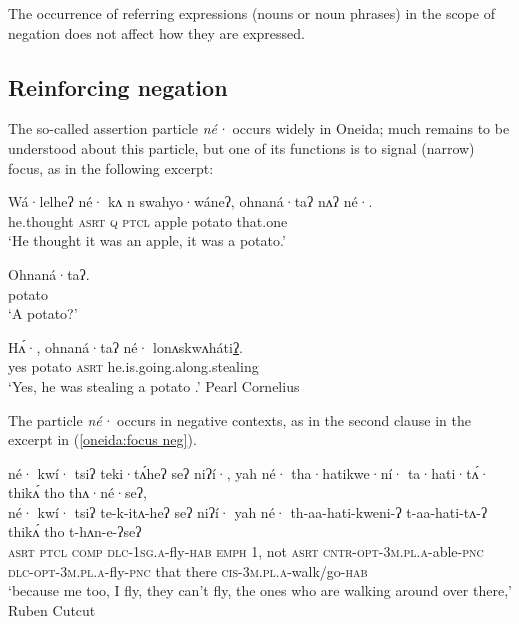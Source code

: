 \documentclass[output=paper,colorlinks,citecolor=brown]{langscibook}
\begin{document}
The occurrence of referring expressions (nouns or noun phrases) in the scope of negation does not affect how they are expressed.

\subsection{Reinforcing negation}
\label{oneida:sec:emph}

The so-called assertion particle \textit{né·} occurs widely in Oneida; much remains to be understood about this particle, but one of its functions is to signal (narrow) focus, as in the following excerpt:

\ea\label{oneida:focus potato}
    \begin{xlist}[B: ]
        \item[A: ] \gll Wá·lelheʔ né· kʌ n swahyo·wáneʔ, ohnaná·taʔ  {nʌʔ né·}. \\
        {he.thought} \textsc{asrt} \textsc{q} \textsc{ptcl} apple potato {that.one} \\
        \glt `He thought it was an apple, it was a potato.' \\
        \item[B: ] Ohnaná·taʔ. \\
        {} potato\\
        \glt `A potato?' \\
        \item[A: ] \gll Hʌ́·, ohnaná·taʔ né· lonʌskwʌháti\uline{ʔ}. \\
         yes potato \textsc{asrt} {he.is.going.along.stealing} \\
        \glt `Yes, he was stealing a potato .' Pearl Cornelius \citep[303 (50--52)]{MichelsonEtAl2016}
    \end{xlist}
\z

The particle \textit{né·} occurs in negative contexts, as in the second clause in the excerpt in (\ref{oneida:focus neg}).

\ea\label{oneida:focus neg}
    \glll né· kwí· tsiʔ teki·tʌ́heʔ seʔ niʔí·, yah né· tha·hatikwe·ní· ta·hati·tʌ́· thikʌ́ tho thʌ·né·seʔ,\\
    né· kwí· tsiʔ te-k-itʌ-heʔ seʔ niʔí· yah né· th-aa-hati-kweni-ʔ t-aa-hati-tʌ-ʔ thikʌ́ tho t-hʌn-e-ʔseʔ \\
    \textsc{asrt} \textsc{ptcl} \textsc{comp} \textsc{dlc-1sg.a}-fly-\textsc{hab} \textsc{emph} \textsc{1}, not \textsc{asrt} \textsc{cntr-opt-3m.pl.a}-able-\textsc{pnc} \textsc{dlc-opt-3m.pl.a}-fly-\textsc{pnc} that there \textsc{cis-3m.pl.a}-walk/go-\textsc{hab} \\
    \glt `because me too, I fly, they can't fly, the ones who are walking around over there,' Ruben Cutcut \citep[36 (8)]{MichelsonEtAl2016}
\z 
\end{document}

